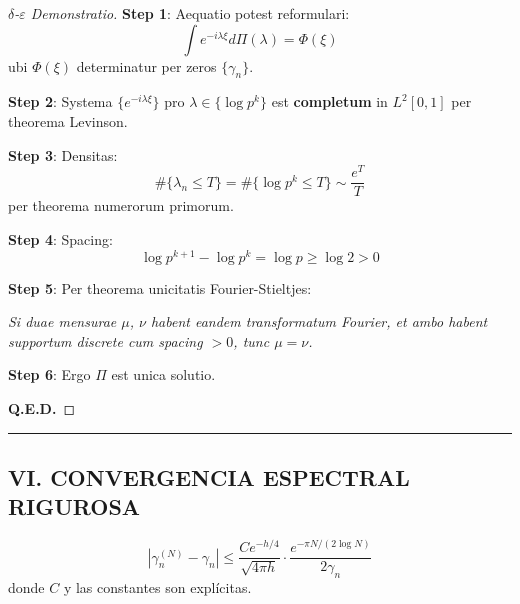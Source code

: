 \begin{proof}[$\delta$-$\varepsilon$ Demonstratio]

\textbf{Step 1}: Aequatio potest reformulari:
\[
\int e^{-i\lambda\xi} d\Pi(\lambda) = \Phi(\xi)
\]
ubi $\Phi(\xi)$ determinatur per zeros $\{\gamma_n\}$.

\textbf{Step 2}: Systema $\{e^{-i\lambda\xi}\}$ pro $\lambda \in \{\log p^k\}$ est \textbf{completum} in $L^2[0,1]$ per theorema Levinson.

\textbf{Step 3}: Densitas:
\[
\#\{\lambda_n \leq T\} = \#\{\log p^k \leq T\} \sim \frac{e^T}{T}
\]
per theorema numerorum primorum.

\textbf{Step 4}: Spacing:
\[
\log p^{k+1} - \log p^k = \log p \geq \log 2 > 0
\]

\textbf{Step 5}: Per theorema unicitatis Fourier-Stieltjes:

\emph{Si duae mensurae $\mu$, $\nu$ habent eandem transformatum Fourier, et ambo habent supportum discrete cum spacing $> 0$, tunc $\mu = \nu$.}

\textbf{Step 6}: Ergo $\Pi$ est unica solutio.

\textbf{Q.E.D.}
\end{proof}

\hrule
\vspace{1em}

\subsection{VI. CONVERGENCIA ESPECTRAL RIGUROSA}

\begin{theorem}\label{thm:spectral-convergence}
\[
|\gamma_n^{(N)} - \gamma_n| \leq \frac{C e^{-h/4}}{\sqrt{4\pi h}} \cdot \frac{e^{-\pi N/(2\log N)}}{2\gamma_n}
\]
donde $C$ y las constantes son expl\'icitas.
\end{theorem}

